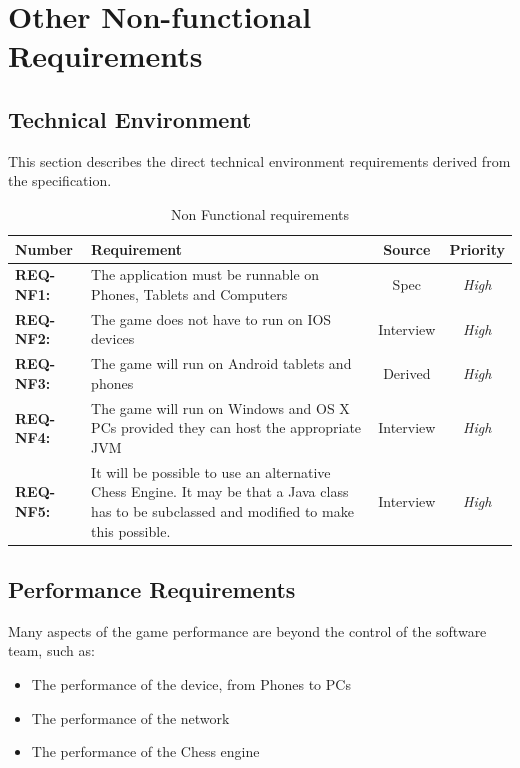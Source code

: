 \documentclass[a4paper,10pt]{article}
\begin{document}
\section{Other Non-functional Requirements}

\subsection{Technical Environment}
This section describes the direct technical environment requirements derived from the specification.



\begin{table}[H]
\caption{Non Functional  requirements}
\label{table:NFReqs}
\begin{tabular}{|| l | p{10.5cm}  |  c  | c ||} \hline  
\textbf{Number} & \textbf{Requirement} & \textbf{Source} & \textbf{Priority}\\ \hline
\textbf{REQ-NF1:}  & The application must be runnable on Phones, Tablets and Computers & Spec & \textit{ High} \\

\textbf{REQ-NF2:} 
&  The game does not have to run on IOS devices
& Interview  &  \textit{High}\\

\textbf{REQ-NF3:} 
&  The game will run on Android tablets and phones
& Derived  &  \textit{High}\\

\textbf{REQ-NF4:} 
&  The game will run on Windows and OS X PCs provided they can host the appropriate JVM
& Interview  &  \textit{High}\\


\textbf{REQ-NF5:} 
& It will be possible to use an alternative Chess Engine. It may be that a Java class has to be subclassed and modified to make this possible. 
& Interview  &  \textit{High}\\

\hline
\end{tabular}
\end{table}


\subsection{Performance Requirements}

Many aspects of the game performance are beyond the control of the software team, such as:
\begin{itemize}
  \item The performance of the device, from Phones to PCs
  \item The performance of the network
  \item The performance of the Chess engine
\end{itemize}
\end{document}
